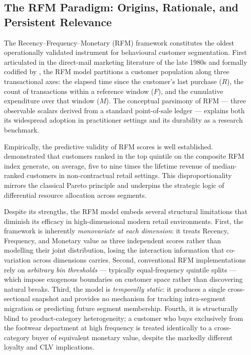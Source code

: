 \subsection{The RFM Paradigm: Origins, Rationale, and Persistent Relevance}

The Recency--Frequency--Monetary (RFM) framework constitutes the oldest operationally validated instrument for behavioural customer segmentation. First articulated in the direct-mail marketing literature of the late 1980s and formally codified by \cite{Hughes1996}, the RFM model partitions a customer population along three transactional axes: the elapsed time since the customer's last purchase ($R$), the count of transactions within a reference window ($F$), and the cumulative expenditure over that window ($M$). The conceptual parsimony of RFM — three observable scalars derived from a standard point-of-sale ledger — explains both its widespread adoption in practitioner settings and its durability as a research benchmark.

Empirically, the predictive validity of RFM scores is well established. \cite{FaderHardieLee2005} demonstrated that customers ranked in the top quintile on the composite RFM index generate, on average, five to nine times the lifetime revenue of median-ranked customers in non-contractual retail settings. This disproportionality mirrors the classical Pareto principle and underpins the strategic logic of differential resource allocation across segments.

Despite its strengths, the RFM model embeds several structural limitations that diminish its efficacy in high-dimensional modern retail environments. First, the framework is inherently \textit{monovariate at each dimension}: it treats Recency, Frequency, and Monetary value as three independent scores rather than modelling their joint distribution, losing the interaction information that co-variation across dimensions carries. Second, conventional RFM implementations rely on \textit{arbitrary bin thresholds} — typically equal-frequency quintile splits — which impose exogenous boundaries on customer space rather than discovering natural breaks. Third, the model is \textit{temporally static}: it produces a single cross-sectional snapshot and provides no mechanism for tracking intra-segment migration or predicting future segment membership. Fourth, it is structurally blind to product-category heterogeneity; a customer who buys exclusively from the footwear department at high frequency is treated identically to a cross-category buyer of equivalent monetary value, despite the markedly different loyalty and CLV implications.

